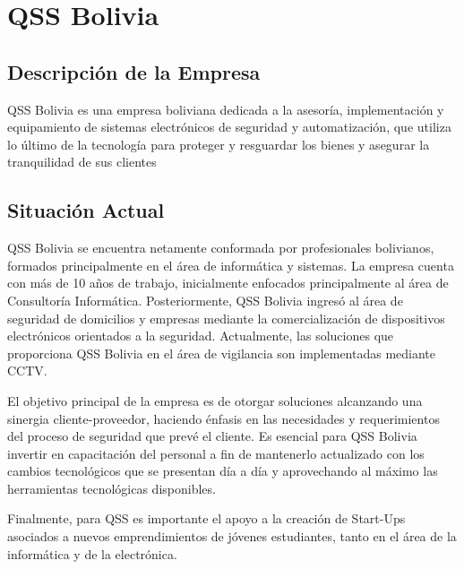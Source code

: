 \chapter{QSS Bolivia}
\section{Descripción de la Empresa}

    QSS Bolivia es una empresa boliviana dedicada a la asesoría, implementación y equipamiento de sistemas electrónicos de seguridad y automatización, que utiliza lo último de la tecnología para proteger y resguardar los bienes y asegurar la tranquilidad de sus clientes \parencite{QSSBolvia2016-el}

\section{Situación Actual}
    QSS Bolivia se encuentra netamente conformada por profesionales bolivianos, formados principalmente en el área de informática y sistemas. La empresa cuenta con más de 10 años de trabajo, inicialmente enfocados principalmente al área de Consultoría Informática. Posteriormente, QSS Bolivia ingresó al área de seguridad de domicilios y empresas mediante la comercialización de dispositivos electrónicos orientados a la seguridad.
    Actualmente, las soluciones que proporciona QSS Bolivia en el área de vigilancia son implementadas mediante CCTV.
    
    El objetivo principal de la empresa es de otorgar soluciones alcanzando una sinergia cliente-proveedor, haciendo énfasis en las necesidades y requerimientos del proceso de seguridad que prevé el cliente.  
    Es esencial para QSS Bolivia invertir en capacitación del personal a fin de mantenerlo actualizado con los cambios tecnológicos que se presentan día a día y aprovechando al máximo las herramientas tecnológicas disponibles. 
    
    Finalmente, para QSS es importante el apoyo a la creación de Start-Ups asociados a nuevos emprendimientos de jóvenes estudiantes, tanto en el área de la informática y de la electrónica.

